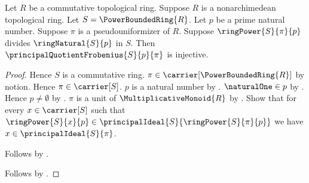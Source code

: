 \begin{theorem}\label{power_bounded_principal_frobenius_injective}
    Let $R$ be a commutative topological ring.
    Suppose $R$ is a nonarchimedean topological ring.
    Let $S=\PowerBoundedRing{R}$.
    Let $p$ be a prime natural number.
    Suppose $\pi$ is a pseudouniformizer of $R$.
    Suppose $\ringPower{S}{\pi}{p}$ divides
        $\ringNatural{S}{p}$ in $S$.
    Then $\principalQuotientFrobenius{S}{p}{\pi}$ is injective.
\end{theorem}
\begin{proof}
    Hence $S$ is a commutative ring.
    $\pi\in\carrier[\PowerBoundedRing{R}]$ by notion.
    Hence $\pi\in\carrier[S]$.
    $p$ is a natural number by .
    $\naturalOne\in p$ by .
    Hence $p\neq\emptyset$ by \auto.
    $\pi$ is a unit of $\MultiplicativeMonoid{R}$ by
        .
    Show that for every $x\in\carrier[S]$ such that
        $\ringPower{S}{x}{p}
            \in\principalIdeal{S}{\ringPower{S}{\pi}{p}}$
        we have $x\in\principalIdeal{S}{\pi}$.
    \begin{subproof}
        Follows by .
    \end{subproof}
    Follows by .
\end{proof}

